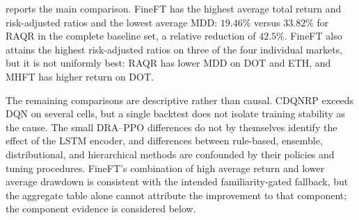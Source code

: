  reports the main comparison. FineFT has the highest average total return and risk-adjusted ratios and the lowest average MDD: $19.46\%$ versus $33.82\%$ for RAQR in the complete baseline set, a relative reduction of $42.5\%$. FineFT also attains the highest risk-adjusted ratios on three of the four individual markets, but it is not uniformly best: RAQR has lower MDD on DOT and ETH, and MHFT has higher return on DOT.

The remaining comparisons are descriptive rather than causal. CDQNRP exceeds DQN on several cells, but a single backtest does not isolate training stability as the cause. The small DRA--PPO differences do not by themselves identify the effect of the LSTM encoder, and differences between rule-based, ensemble, distributional, and hierarchical methods are confounded by their policies and tuning procedures. FineFT's combination of high average return and lower average drawdown is consistent with the intended familiarity-gated fallback, but the aggregate table alone cannot attribute the improvement to that component; the component evidence is considered below.

